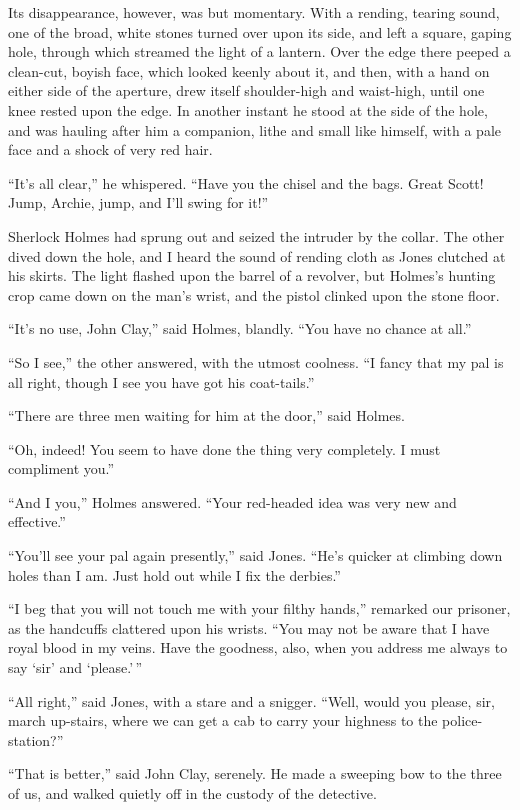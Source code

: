 Its disappearance, however, was but momentary. With a
rending, tearing sound, one of the broad, white stones turned
over upon its side, and left a square, gaping hole, through
which streamed the light of a lantern. Over the edge there
peeped a clean-cut, boyish face, which looked keenly about it,
and then, with a hand on either side of the aperture, drew itself
shoulder-high and waist-high, until one knee rested upon
the edge. In another instant he stood at the side of the
hole, and was hauling after him a companion, lithe and small
like himself, with a pale face and a shock of very red hair.

“It’s all clear,” he whispered. “Have you the chisel and
the bags. Great Scott! Jump, Archie, jump, and I’ll swing
for it!”

Sherlock Holmes had sprung out and seized the intruder
by the collar. The other dived down the hole, and I heard
the sound of rending cloth as Jones clutched at his skirts.
The light flashed upon the barrel of a revolver, but Holmes’s
hunting crop came down on the man’s wrist, and the pistol
clinked upon the stone floor.

“It’s no use, John Clay,” said Holmes, blandly. “You have
no chance at all.”

“So I see,” the other answered, with the utmost coolness.
“I fancy that my pal is all right, though I see you have got
his coat-tails.”

“There are three men waiting for him at the door,” said
Holmes.

“Oh, indeed! You seem to have done the thing very
completely. I must compliment you.”

“And I you,” Holmes answered. “Your red-headed idea
was very new and effective.”

“You’ll see your pal again presently,” said Jones. “He’s
quicker at climbing down holes than I am. Just hold out
while I fix the derbies.”

“I beg that you will not touch me with your filthy hands,”
remarked our prisoner, as the handcuffs clattered upon his
wrists. “You may not be aware that I have royal blood in
my veins. Have the goodness, also, when you address me always
to say ‘sir’ and ‘please.’\,”

“All right,” said Jones, with a stare and a snigger. “Well,
would you please, sir, march up-stairs, where we can get a cab
to carry your highness to the police-station?”

“That is better,” said John Clay, serenely. He made a
sweeping bow to the three of us, and walked quietly off in the
custody of the detective.

